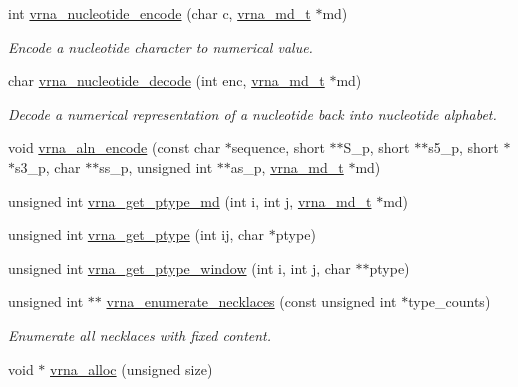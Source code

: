 \begin{DoxyCompactItemize}
int \mbox{\hyperlink{group__utils_gac12bf00123f88621c9be847b0879c1fb}{vrna\+\_\+nucleotide\+\_\+encode}} (char c, \mbox{\hyperlink{group__model__details_ga1f8a10e12a0a1915f2a4eff0b28ea17c}{vrna\+\_\+md\+\_\+t}} $\ast$md)
\begin{DoxyCompactList}\small\item\em Encode a nucleotide character to numerical value. \end{DoxyCompactList}\item 
char \mbox{\hyperlink{group__utils_ga48ef585e697be9c8a08ed68c655e29b6}{vrna\+\_\+nucleotide\+\_\+decode}} (int enc, \mbox{\hyperlink{group__model__details_ga1f8a10e12a0a1915f2a4eff0b28ea17c}{vrna\+\_\+md\+\_\+t}} $\ast$md)
\begin{DoxyCompactList}\small\item\em Decode a numerical representation of a nucleotide back into nucleotide alphabet. \end{DoxyCompactList}\item 
void \mbox{\hyperlink{group__utils_ga56dfbd38023d289a3b5daf7fe06ab4d6}{vrna\+\_\+aln\+\_\+encode}} (const char $\ast$sequence, short $\ast$$\ast$S\+\_\+p, short $\ast$$\ast$s5\+\_\+p, short $\ast$$\ast$s3\+\_\+p, char $\ast$$\ast$ss\+\_\+p, unsigned int $\ast$$\ast$as\+\_\+p, \mbox{\hyperlink{group__model__details_ga1f8a10e12a0a1915f2a4eff0b28ea17c}{vrna\+\_\+md\+\_\+t}} $\ast$md)
\item 
unsigned int \mbox{\hyperlink{group__utils_ga629aeca7a1a5d148e2c7e0e5d12299cc}{vrna\+\_\+get\+\_\+ptype\+\_\+md}} (int i, int j, \mbox{\hyperlink{group__model__details_ga1f8a10e12a0a1915f2a4eff0b28ea17c}{vrna\+\_\+md\+\_\+t}} $\ast$md)
\item 
unsigned int \mbox{\hyperlink{group__utils_ga1cef98562ce6016ed83e38bc15d7b4bb}{vrna\+\_\+get\+\_\+ptype}} (int ij, char $\ast$ptype)
\item 
unsigned int \mbox{\hyperlink{group__utils_gab134b2a70a6933b7f3aada9abdc7b96e}{vrna\+\_\+get\+\_\+ptype\+\_\+window}} (int i, int j, char $\ast$$\ast$ptype)
\item 
unsigned int $\ast$$\ast$ \mbox{\hyperlink{group__utils_gae081ac655a76bd5c4b3d86c60b096b75}{vrna\+\_\+enumerate\+\_\+necklaces}} (const unsigned int $\ast$type\+\_\+counts)
\begin{DoxyCompactList}\small\item\em Enumerate all necklaces with fixed content. \end{DoxyCompactList}\item 
void $\ast$ \mbox{\hyperlink{group__utils_gaf37a0979367c977edfb9da6614eebe99}{vrna\+\_\+alloc}} (unsigned size)
$$
\end{DoxyCompactItemize}
